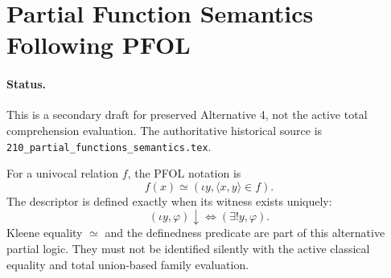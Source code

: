 \def\topic{Partial Functions: Alternative PFOL Draft}

\section{Partial Function Semantics Following PFOL}

\paragraph{Status.}
This is a secondary draft for preserved Alternative 4, not the active total
comprehension evaluation. The authoritative historical source is
\texttt{210\_partial\_functions\_semantics.tex}.

For a univocal relation $f$, the PFOL notation is
\[
f(x)\simeq(\iota y,\langle x,y\rangle\in f).
\]
The descriptor is defined exactly when its witness exists uniquely:
\[
(\iota y,\varphi)\downarrow\iff(\exists!y,\varphi).
\]
Kleene equality $\simeq$ and the definedness predicate are part of this
alternative partial logic. They must not be identified silently with the
active classical equality and total union-based family evaluation.


